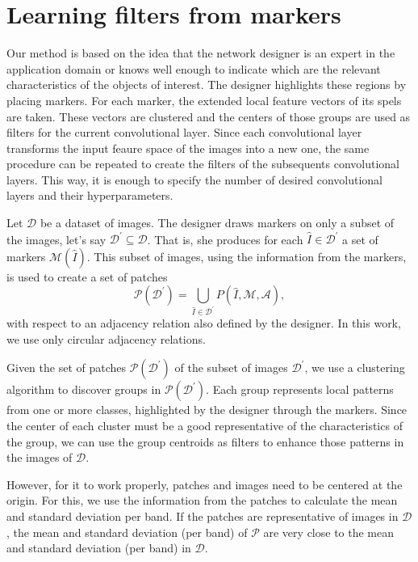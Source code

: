 \documentclass[10pt,twocolumn,letterpaper]{article}
\newcommand{\A}{\mathcal{A}}
\newcommand{\D}{\mathcal{D}}
\newcommand{\I}{\hat{I}}
\newcommand{\M}{\mathcal{M}}
\newcommand{\Pa}{\mathcal{P}}
\newcommand{\pDD}{\D^\prime}
\begin{document}
\section{Learning filters from markers}
Our method is based on the idea that the network designer is an expert in the application domain or knows well enough to indicate which are the relevant characteristics of the objects of interest. The designer highlights these regions by placing markers. For each marker, the extended local feature vectors of its spels are taken. These vectors are clustered and the centers of those groups are used as filters for the current convolutional layer. Since each convolutional layer transforms the input feaure space of the images into a new one, the same procedure can be repeated to create the filters of the subsequents convolutional layers. This way, it is enough to specify the number of desired convolutional layers and their hyperparameters. 

Let $\D$ be a dataset of images. The designer draws markers on only a subset of the images, let's say $\pDD \subseteq \D$. That is, she produces for each $\I \in \pDD$ a set of markers $\M(\I)$.  This subset of images, using the information from the markers, is used to create a set of patches \[\Pa(\pDD) = \bigcup_{\I \in \pDD}{P(\I, \M, \A)},\] with respect to an adjacency relation also defined by the designer. In this work, we use only circular adjacency relations.

Given the set of patches $\Pa(\pDD)$ of the subset of images $\pDD$, we use a clustering algorithm to discover groups in $\Pa(\pDD)$. Each group represents local patterns from one or more classes, highlighted by the designer through the markers. Since the center of each cluster must be a good representative of the characteristics of the group, we can use the group centroids as filters to enhance those patterns in the images of $\D$.

However, for it to work properly, patches and images need to be centered at the origin. For this, we use the information from the patches to calculate the mean and standard deviation per band. If the patches are representative of images in $\D$, the mean and standard deviation (per band) of $\Pa$ are very close to the mean and standard deviation (per band) in $\D$.
\end{document}
